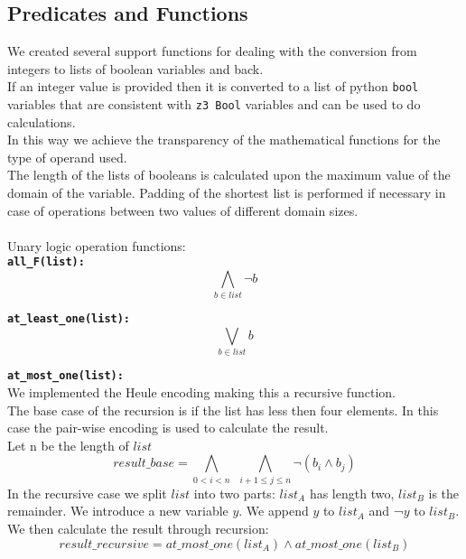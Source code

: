 
\subsection{Predicates and Functions}
We created several support functions for dealing with the conversion from integers to lists of
boolean variables and back.\\
If an integer value is provided then it is converted to a list of python \texttt{bool} variables
that are consistent with 
\texttt{z3 Bool} variables and can be used to do calculations.\\
In this way we achieve the transparency of the mathematical functions for the type of operand 
used.\\
The length of the lists of booleans is calculated upon the maximum value of the domain of the
variable. Padding of the shortest list is performed if necessary in case of operations between
 two values of different domain sizes.
\\\\
Unary logic operation functions:\\
\texttt{\textbf{all\_F(list):}} 
\begin{equation}
    \bigwedge\limits_{b \in list}\neg b
\end{equation}

\texttt{\textbf{at\_least\_one(list):}}
\begin{equation}
        \bigvee\limits_{b \in list} b
\end{equation}

\texttt{\textbf{at\_most\_one(list):}}\\
We implemented the Heule encoding making this a recursive function.\\
The base case of the recursion is if the list has less then four elements. In this case the 
pair-wise encoding is used to calculate the result.\\
Let n be the length of $list$
\begin{equation}
        result\_base = \bigwedge\limits_{0 < i < n} \ \ \bigwedge\limits_{i+1 \leq j \leq n}\neg (b_i \wedge b_j)
\end{equation}
In the recursive case we split $list$ into two parts: $list_A$ has length two, $list_B$ is
 the remainder. We introduce a new variable $y$. We append $y$ to $list_A$ and ¬$y$ to 
 $list_B$. We then calculate the result through recursion:
\begin{equation}
    result\_recursive = at\_most\_one(list_A) \wedge at\_most\_one(list_B)
\end{equation}

